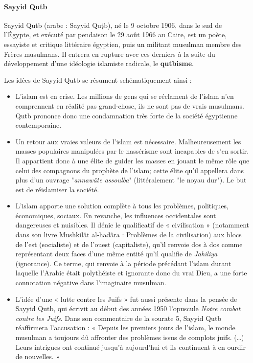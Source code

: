 \label{theol:SayyidQutb}
\paragraph{Sayyid Qutb}
Sayyid Qutb (arabe : Sayyid Quṭb), né le 9 octobre 1906, dans le sud de l'Égypte, et exécuté par pendaison le 29 août 1966 au Caire, est un poète, essayiste et critique littéraire égyptien, puis un militant musulman membre des Frères musulmans. Il entrera en rupture avec ces derniers à la suite du développement d'une idéologie islamiste radicale, le \textbf{qutbisme}.


Les idées de Sayyid Qutb se résument schématiquement ainsi :
\begin{itemize}
    \item 
L'islam est en crise. Les millions de gens qui se réclament de l'islam n'en comprennent en réalité pas grand-chose, ils ne sont pas de vrais musulmans. Qutb prononce donc une condamnation très forte de la société égyptienne contemporaine.
  \item 
Un retour aux vraies valeurs de l'islam est nécessaire. Malheureusement les masses populaires manipulées par le nassérisme sont incapables de s’en sortir. Il appartient donc à une élite de guider les masses en jouant le même rôle que celui des compagnons du prophète de l'islam; cette élite qu'il appellera dans plus d'un ouvrage "\textit{annawâte assoulba}" (littéralement "le noyau dur"). Le but est de réislamiser la société.
  \item 
L'islam apporte une solution complète à tous les problèmes, politiques, économiques, sociaux. En revanche, les influences occidentales sont dangereuses et nuisibles. Il dénie le qualificatif de « civilisation » (notamment dans son livre Mushkilât al-hadâra : Problèmes de la civilisation) aux blocs de l'est (socialiste) et de l'ouest (capitaliste), qu'il renvoie dos à dos comme représentant deux faces d'une même entité qu'il qualifie de \textit{Jahiliya} (ignorance). Ce terme, qui renvoie à la période précédant l'islam durant laquelle l'Arabie était polythéiste et ignorante donc du vrai Dieu, a une forte connotation négative dans l'imaginaire musulman.
  \item 
L'idée d'une « lutte contre les Juifs » fut aussi présente dans la pensée de Sayyid Qutb, qui écrivit au début des années 1950 l'opuscule \textit{Notre combat contre les Juifs}. Dans son commentaire de la sourate 5, Sayyid Qutb réaffirmera l’accusation : « Depuis les premiers jours de l’islam, le monde musulman a toujours dû affronter des problèmes issus de complots juifs. (…) Leurs intrigues ont continué jusqu’à aujourd’hui et ils continuent à en ourdir de nouvelles. » 
\end{itemize}




